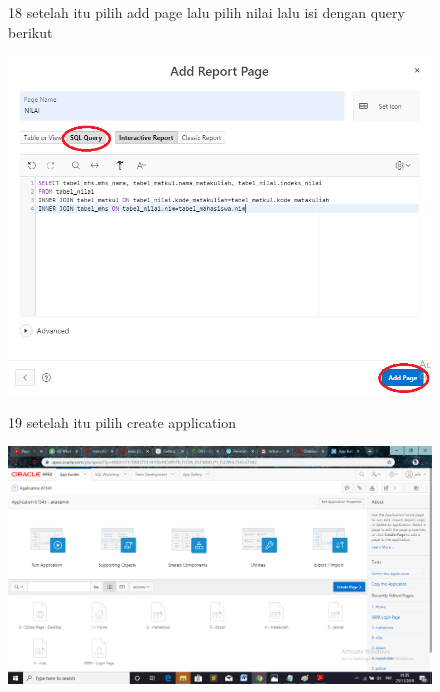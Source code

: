 \begin{enumerate}
\begin{figure}
\item[18]setelah itu pilih add page lalu pilih nilai lalu isi dengan query berikut
 \begin{center}
\includegraphics[scale=0.4]{apex/ss26.png}
    \caption{\textit{}}
        \end{center}
\label{gambar}
\end{figure}

\begin{figure}
\item[19]setelah itu pilih create application
 \begin{center}
\includegraphics[scale=0.4]{apex/ss23.png}
    \caption{\textit{}}
        \end{center}
\label{gambar}
\end{figure}


\end{enumerate}
